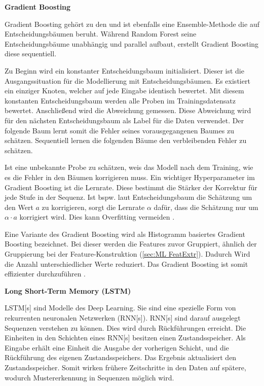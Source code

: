 \textbf{Gradient Boosting} \par
Gradient Boosting gehört zu den  und ist ebenfalls eine Ensemble-Methode die auf Entscheidungsbäumen beruht. Während Random Forest seine Entscheidungsbäume unabhängig und parallel aufbaut, erstellt Gradient Boosting diese sequentiell. \par 

Zu Beginn wird ein konstanter Entscheidungsbaum initialisiert. Dieser ist die Ausgangssituation für die Modellierung mit Entscheidungsbäumen. Es existiert ein einziger Knoten, welcher auf jede Eingabe identisch bewertet. Mit diesem konstanten Entscheidungsbaum werden alle Proben im \gls{Trainingsdatensatz} bewertet. Anschließend wird die Abweichung gemessen. Diese Abweichung wird für den nächsten Entscheidungsbaum als \gls{Label} für die Daten verwendet. Der folgende Baum lernt somit die Fehler seines vorausgegangenen Baumes zu schätzen. Sequentiell lernen die folgenden Bäume den verbleibenden Fehler zu schätzen. \par

Ist eine unbekannte Probe zu schätzen, weis das Modell nach dem Training, wie es die Fehler in den Bäumen korrigieren muss. Ein wichtiger \gls{Hyperparameter} im Gradient Boosting ist die Lernrate. Diese bestimmt die Stärker der Korrektur für jede Stufe in der Sequenz. Ist bspw. laut Entscheidungsbaum die Schätzung um den Wert \(a\) zu korrigieren, sorgt die Lernrate \(\alpha\) dafür, dass die Schätzung nur um \(\alpha \cdot a\) korrigiert wird. Dies kann Overfitting vermeiden \cite{Burkov.2019}. \par

Eine Variante des Gradient Boosting wird als Histogramm basiertes Gradient Boosting bezeichnet. Bei dieser werden die Features zuvor Gruppiert, ähnlich der Gruppierung bei der Feature-Konstruktion (\ref{sec:ML FeatExtr}). Dadurch Wird die Anzahl unterschiedlicher Werte reduziert. Das Gradient Boosting ist somit effizienter durchzuführen \cite{Ke.2017}. 
\dubpar


\textbf{Long Short-Term Memory (\acrshort{LSTM})} \par
\acrshort{LSTM}[s] sind Modelle des \gls{Deep Learning}. Sie sind eine spezielle Form von rekurrenten neuronalen Netzwerken (\acrshort{RNN}[s]). \acrshort{RNN}[s] sind darauf ausgelegt Sequenzen verstehen zu können. Dies wird durch Rückführungen erreicht. Die Einheiten in den Schichten eines \acrshort{RNN}[s] besitzen einen Zustandsspeicher. Als Eingabe erhält eine Einheit die Ausgabe der vorherigen Schicht, und die Rückführung des eigenen Zustandsspeichers. Das Ergebnis aktualisiert den Zustandsspeicher. Somit wirken frühere Zeitschritte in den Daten auf spätere, wodurch Mustererkennung in Sequenzen möglich wird.\par

